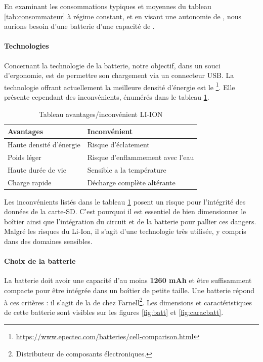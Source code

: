 En examinant les consommations typiques et moyennes du tableau \ref{tab:consommateur} à régime constant, et en visant une autonomie de , nous aurions besoin d'une batterie d'une capacité de .

\paragraph{Technologies} Concernant la technologie de la batterie, notre objectif, dans un souci d'ergonomie, est de permettre son chargement via un connecteur USB. La technologie offrant actuellement la meilleure densité d'énergie est le \footnote{\href{https://www.epectec.com/batteries/cell-comparison.html}{https://www.epectec.com/batteries/cell-comparison.html}}. Elle présente cependant des inconvénients, énumérés dans le tableau \ref{tab:inconvlion}.

\begin{table}[h]
	\centering
	\begin{tabular}{l|l}
		Avantages &  Inconvénient\\
		\hline
		Haute densité d'énergie & Risque d'éclatement \\
		Poids léger & Risque d'enflammement avec l'eau \\ 
		Haute durée de vie & Sensible a la température \\
		Charge rapide & Décharge complète altérante \\
		\hline
	\end{tabular}
		\caption{Tableau avantages/inconvénient LI-ION}
		\label{tab:inconvlion}
\end{table}

Les inconvénients listés dans le tableau \ref{tab:inconvlion} posent un risque pour l'intégrité des données de la carte-SD. C'est pourquoi il est essentiel de bien dimensionner le boîtier ainsi que l'intégration du circuit et de la batterie pour pallier ces dangers. Malgré les risques du Li-Ion, il s'agit d'une technologie très utilisée, y compris dans des domaines sensibles.

\clearpage

\paragraph{Choix de la batterie} La batterie doit avoir une capacité d'au moins \textbf{1260 mAh} et être suffisamment compacte pour être intégrée dans un boîtier de petite taille. Une batterie répond à ces critères : il s'agit de la  de chez Farnell\footnote{Distributeur de composants électroniques.}. Les dimensions et caractéristiques de cette batterie sont visibles sur les figures \ref{fig:batt} et \ref{fig:caracbatt}.


